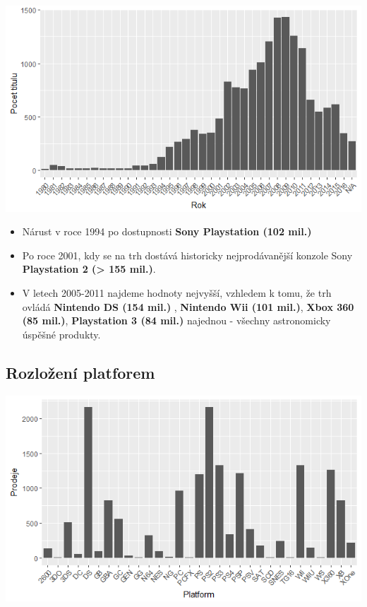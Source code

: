 \documentclass[a4paper,11pt]{article}
\begin{document}
\includegraphics[scale=0.8]{Rplot}

\begin{itemize}
\item Nárust v roce 1994 po dostupnosti \textbf{Sony Playstation (102 mil.)}

\item Po roce 2001, kdy se na trh dostává historicky nejprodávanější konzole Sony \textbf{Playstation 2 (> 155 mil.)}.

\item V letech 2005-2011 najdeme hodnoty nejvyšší, vzhledem k tomu, že trh ovládá \textbf{Nintendo DS (154 mil.)} , \textbf{Nintendo Wii (101 mil.)}, \textbf{Xbox 360 (85 mil.)}, \textbf{Playstation 3 (84 mil.)}  najednou - všechny astronomicky úspěšné produkty.
\end{itemize}


\newpage

\subsection{Rozložení platforem}

\includegraphics[scale=0.75]{Rplot03}
\end{document}
